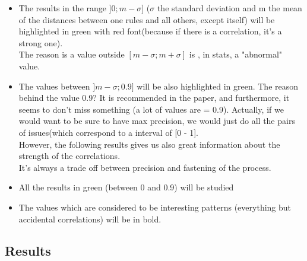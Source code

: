 \documentclass{article}
\begin{document}
\begin{itemize}


\item The results in the range $]0 ; m-\sigma]$ ($\sigma$ the standard deviation and m the mean of the distances between one rules and all others, except itself) will be highlighted in green with red font(because if there is a correlation, it's a strong one). \\
The reason is a value outside $[m-\sigma ; m+\sigma]$ is , in stats, a "abnormal" value. 


\item The values between $]m-\sigma;0.9]$ will be also highlighted in green. The reason behind the value 0.9? It is recommended in the paper, and furthermore, it seems to don't miss something (a lot of values are = 0.9). Actually, if we would want to be sure to have max precision, we would just do all the pairs of issues(which correspond to a interval of [0 - 1]. \\ However, the following results gives us also great information about the strength of the correlations. \\
It's always a trade off between precision and fastening of the process. \\

\item  All the results in green (between 0 and 0.9) will be studied \\

\item The values which are considered to be interesting patterns (everything but accidental correlations) will be in bold.


\end{itemize}

\subsection{Results} 
\end{document}
